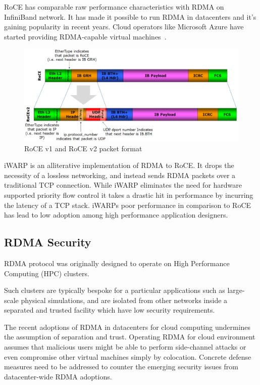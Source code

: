 RoCE has comparable raw performance characteristics with RDMA on InfiniBand
network. It has made it possible to run RDMA in datacenters and it's gaining
popularity in recent years. Cloud operators like Microsoft Azure have started
providing RDMA-capable virtual machines~\cite{news:azure.rdma}.

\begin{figure}[ht]
    \centering
    \includegraphics[width=\textwidth]{fig/RoCE_Header_format}
    \caption{RoCE v1 and RoCE v2 packet format}
    \label{fig:roce_header_format}
\end{figure}

iWARP is an alliterative implementation of RDMA to RoCE. It drops the necessity of
a lossless networking, and instead sends RDMA packets over a traditional TCP
connection. While iWARP eliminates the need for hardware supported priority flow
control it takes a drastic hit in performance by incurring the latency of a TCP
stack. iWARPs poor performance in comparison to RoCE has lead to low adoption
among high performance application designers.

\subsection{RDMA Security}

RDMA protocol was originally designed to operate on High Performance
Computing (HPC) clusters.  

Such clusters are typically bespoke for a particular applications such as
large-scale physical simulations, and are isolated from other networks inside a
separated and trusted facility which have low security requirements.

The recent adoptions of RDMA in datacenters for cloud computing undermines the
assumption of separation and trust. Operating RDMA for cloud environment assumes
that malicious users might be able to perform side-channel attacks or even
compromise other virtual machines simply by colocation.  Concrete defense
measures need to be addressed to counter the emerging security issues from
datacenter-wide RDMA adoptions.
 
